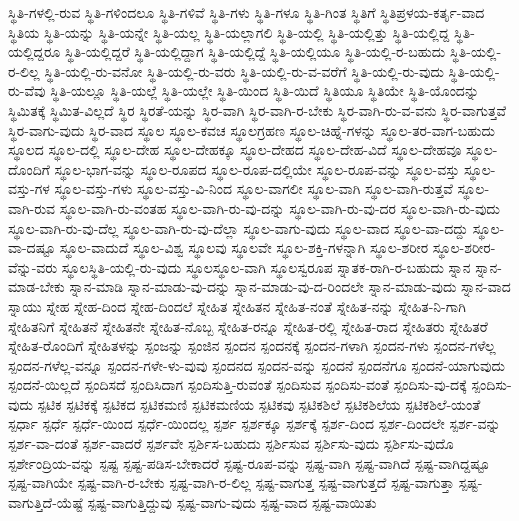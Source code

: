 {ಸ್ಥಿತಿ-ಗಳಲ್ಲಿ-ರುವ
ಸ್ಥಿತಿ-ಗಳಿಂದಲೂ
ಸ್ಥಿತಿ-ಗಳಿವೆ
ಸ್ಥಿತಿ-ಗಳು
ಸ್ಥಿತಿ-ಗಳೂ
ಸ್ಥಿತಿ-ಗಿಂತ
ಸ್ಥಿತಿಗೆ
ಸ್ಥಿತಿಪ್ರಳಯ-ಕರ್ತೃ-ವಾದ
ಸ್ಥಿತಿಯ
ಸ್ಥಿತಿ-ಯನ್ನು
ಸ್ಥಿತಿ-ಯನ್ನೇ
ಸ್ಥಿತಿ-ಯಲ್ಲ
ಸ್ಥಿತಿ-ಯಲ್ಲಾಗಲಿ
ಸ್ಥಿತಿ-ಯಲ್ಲಿ
ಸ್ಥಿತಿ-ಯಲ್ಲಿತ್ತು
ಸ್ಥಿತಿ-ಯಲ್ಲಿದ್ದ
ಸ್ಥಿತಿ-ಯಲ್ಲಿದ್ದರೂ
ಸ್ಥಿತಿ-ಯಲ್ಲಿದ್ದರೆ
ಸ್ಥಿತಿ-ಯಲ್ಲಿದ್ದಾಗ
ಸ್ಥಿತಿ-ಯಲ್ಲಿದ್ದೆ
ಸ್ಥಿತಿ-ಯಲ್ಲಿಯೂ
ಸ್ಥಿತಿ-ಯಲ್ಲಿ-ರ-ಬಹುದು
ಸ್ಥಿತಿ-ಯಲ್ಲಿ-ರ-ಲಿಲ್ಲ
ಸ್ಥಿತಿ-ಯಲ್ಲಿ-ರು-ವನೋ
ಸ್ಥಿತಿ-ಯಲ್ಲಿ-ರು-ವರು
ಸ್ಥಿತಿ-ಯಲ್ಲಿ-ರು-ವ-ವರೆಗೆ
ಸ್ಥಿತಿ-ಯಲ್ಲಿ-ರು-ವುದು
ಸ್ಥಿತಿ-ಯಲ್ಲಿ-ರು-ವೆವು
ಸ್ಥಿತಿ-ಯಲ್ಲೂ
ಸ್ಥಿತಿ-ಯಲ್ಲೆ
ಸ್ಥಿತಿ-ಯಲ್ಲೇ
ಸ್ಥಿತಿ-ಯಿಂದ
ಸ್ಥಿತಿ-ಯಿದೆ
ಸ್ಥಿತಿಯೂ
ಸ್ಥಿತಿಯೇ
ಸ್ಥಿತಿ-ಯೊಂದನ್ನು
ಸ್ಥಿಮಿತಕ್ಕೆ
ಸ್ಥಿಮಿತ-ವಿಲ್ಲದೆ
ಸ್ಥಿರ
ಸ್ಥಿರತೆ-ಯನ್ನು
ಸ್ಥಿರ-ವಾಗಿ
ಸ್ಥಿರ-ವಾಗಿ-ರ-ಬೇಕು
ಸ್ಥಿರ-ವಾಗಿ-ರು-ವ-ವನು
ಸ್ಥಿರ-ವಾಗುತ್ತವೆ
ಸ್ಥಿರ-ವಾಗು-ವುದು
ಸ್ಥಿರ-ವಾದ
ಸ್ಥೂಲ
ಸ್ಥೂಲ-ಕವಚ
ಸ್ಥೂಲಗ್ರಹಣ
ಸ್ಥೂಲ-ಚಿಹ್ನೆ-ಗಳನ್ನು
ಸ್ಥೂಲ-ತರ-ವಾಗ-ಬಹುದು
ಸ್ಥೂಲದ
ಸ್ಥೂಲ-ದಲ್ಲಿ
ಸ್ಥೂಲ-ದೇಹ
ಸ್ಥೂಲ-ದೇಹಕ್ಕೂ
ಸ್ಥೂಲ-ದೇಹದ
ಸ್ಥೂಲ-ದೇಹ-ವಿದೆ
ಸ್ಥೂಲ-ದೇಹವೂ
ಸ್ಥೂಲ-ದೊಂದಿಗೆ
ಸ್ಥೂಲ-ಭಾಗ-ವನ್ನು
ಸ್ಥೂಲ-ರೂಪದ
ಸ್ಥೂಲ-ರೂಪ-ದಲ್ಲಿಯೇ
ಸ್ಥೂಲ-ರೂಪ-ವನ್ನು
ಸ್ಥೂಲ-ವಸ್ತು
ಸ್ಥೂಲ-ವಸ್ತು-ಗಳ
ಸ್ಥೂಲ-ವಸ್ತು-ಗಳು
ಸ್ಥೂಲ-ವಸ್ತು-ವಿ-ನಿಂದ
ಸ್ಥೂಲ-ವಾಗಲೀ
ಸ್ಥೂಲ-ವಾಗಿ
ಸ್ಥೂಲ-ವಾಗಿ-ರುತ್ತವೆ
ಸ್ಥೂಲ-ವಾಗಿ-ರುವ
ಸ್ಥೂಲ-ವಾಗಿ-ರು-ವಂತಹ
ಸ್ಥೂಲ-ವಾಗಿ-ರು-ವು-ದನ್ನು
ಸ್ಥೂಲ-ವಾಗಿ-ರು-ವು-ದರ
ಸ್ಥೂಲ-ವಾಗಿ-ರು-ವುದು
ಸ್ಥೂಲ-ವಾಗಿ-ರು-ವು-ದೆಲ್ಲ
ಸ್ಥೂಲ-ವಾಗಿ-ರು-ವು-ದೆಲ್ಲಾ
ಸ್ಥೂಲ-ವಾಗು-ವುದು
ಸ್ಥೂಲ-ವಾದ
ಸ್ಥೂಲ-ವಾ-ದದ್ದು
ಸ್ಥೂಲ-ವಾ-ದಷ್ಟೂ
ಸ್ಥೂಲ-ವಾದುದೆ
ಸ್ಥೂಲ-ವಿಶ್ವ
ಸ್ಥೂಲವು
ಸ್ಥೂಲವೇ
ಸ್ಥೂಲ-ಶಕ್ತಿ-ಗಳನ್ನಾಗಿ
ಸ್ಥೂಲ-ಶರೀರ
ಸ್ಥೂಲ-ಶರೀರ-ವೆನ್ನು-ವರು
ಸ್ಥೂಲಸ್ಥಿತಿ-ಯಲ್ಲಿ-ರು-ವುದು
ಸ್ಥೂಲಸ್ಥೂಲ-ವಾಗಿ
ಸ್ಥೂಲಸ್ವರೂಪ
ಸ್ನಾತಕ-ರಾಗಿ-ರ-ಬಹುದು
ಸ್ನಾನ
ಸ್ನಾನ-ಮಾಡ-ಬೇಕು
ಸ್ನಾನ-ಮಾಡಿ
ಸ್ನಾನ-ಮಾಡು-ವು-ದನ್ನು
ಸ್ನಾನ-ಮಾಡು-ವು-ದ-ರಿಂದಲೇ
ಸ್ನಾನ-ಮಾಡು-ವುದು
ಸ್ನಾನ-ವಾದ
ಸ್ನಾಯು
ಸ್ನೇಹ
ಸ್ನೇಹ-ದಿಂದ
ಸ್ನೇಹ-ದಿಂದಲೆ
ಸ್ನೇಹಿತ
ಸ್ನೇಹಿತನ
ಸ್ನೇಹಿತ-ನಂತೆ
ಸ್ನೇಹಿತ-ನನ್ನು
ಸ್ನೇಹಿತ-ನಿ-ಗಾಗಿ
ಸ್ನೇಹಿತನಿಗೆ
ಸ್ನೇಹಿತನೆ
ಸ್ನೇಹಿತನೇ
ಸ್ನೇಹಿತ-ನೊಬ್ಬ
ಸ್ನೇಹಿತ-ರನ್ನೂ
ಸ್ನೇಹಿತ-ರಲ್ಲಿ
ಸ್ನೇಹಿತ-ರಾದ
ಸ್ನೇಹಿತರು
ಸ್ನೇಹಿತರೆ
ಸ್ನೇಹಿತ-ರೊಂದಿಗೆ
ಸ್ನೇಹಿತಳನ್ನು
ಸ್ಪಂಜನ್ನು
ಸ್ಪಂಜಿನ
ಸ್ಪಂದನ
ಸ್ಪಂದನಕ್ಕೆ
ಸ್ಪಂದನ-ಗಳಾಗಿ
ಸ್ಪಂದನ-ಗಳು
ಸ್ಪಂದನ-ಗಳೆಲ್ಲ
ಸ್ಪಂದನ-ಗಳೆಲ್ಲ-ವನ್ನೂ
ಸ್ಪಂದನ-ಗಳೇ-ಳು-ವುವು
ಸ್ಪಂದನದ
ಸ್ಪಂದನ-ವನ್ನು
ಸ್ಪಂದನೆ
ಸ್ಪಂದನೆಗೂ
ಸ್ಪಂದನೆ-ಯಾಗುವುದು
ಸ್ಪಂದನೆ-ಯಿಲ್ಲದೆ
ಸ್ಪಂದಿಸದೆ
ಸ್ಪಂದಿಸಿದಾಗ
ಸ್ಪಂದಿಸುತ್ತಿ-ರುವಂತೆ
ಸ್ಪಂದಿಸುವ
ಸ್ಪಂದಿಸು-ವಂತೆ
ಸ್ಪಂದಿಸು-ವು-ದಕ್ಕೆ
ಸ್ಪಂದಿಸು-ವುದು
ಸ್ಪಟಿಕ
ಸ್ಪಟಿಕಕ್ಕೆ
ಸ್ಪಟಿಕದ
ಸ್ಪಟಿಕಮಣಿ
ಸ್ಪಟಿಕಮಣಿಯ
ಸ್ಪಟಿಕವು
ಸ್ಪಟಿಕಶಿಲೆ
ಸ್ಪಟಿಕಶಿಲೆಯ
ಸ್ಪಟಿಕಶಿಲೆ-ಯಂತೆ
ಸ್ಪರ್ಧಾ
ಸ್ಪರ್ಧೆ
ಸ್ಪರ್ಧೆ-ಯಿಂದ
ಸ್ಪರ್ಧೆ-ಯಿಂದಲ್ಲ
ಸ್ಪರ್ಶ
ಸ್ಪರ್ಶಕ್ಕೂ
ಸ್ಪರ್ಶಕ್ಕೆ
ಸ್ಪರ್ಶ-ದಿಂದ
ಸ್ಪರ್ಶ-ದಿಂದಲೇ
ಸ್ಪರ್ಶ-ವನ್ನು
ಸ್ಪರ್ಶ-ವಾ-ದಂತೆ
ಸ್ಪರ್ಶ-ವಾದರೆ
ಸ್ಪರ್ಶವೇ
ಸ್ಪರ್ಶಿಸ-ಬಹುದು
ಸ್ಪರ್ಶಿಸುವ
ಸ್ಪರ್ಶಿಸು-ವುದು
ಸ್ಪರ್ಶಿಸು-ವುದೊ
ಸ್ಪರ್ಶೇಂದ್ರಿಯ-ವನ್ನು
ಸ್ಪಷ್ಟ
ಸ್ಪಷ್ಟ-ಪಡಿಸ-ಬೇಕಾದರೆ
ಸ್ಪಷ್ಟ-ರೂಪ-ವನ್ನು
ಸ್ಪಷ್ಟ-ವಾಗಿ
ಸ್ಪಷ್ಟ-ವಾಗಿದೆ
ಸ್ಪಷ್ಟ-ವಾಗಿದ್ದಷ್ಟೂ
ಸ್ಪಷ್ಟ-ವಾಗಿಯೇ
ಸ್ಪಷ್ಟ-ವಾಗಿ-ರ-ಬೇಕು
ಸ್ಪಷ್ಟ-ವಾಗಿ-ರ-ಲಿಲ್ಲ
ಸ್ಪಷ್ಟ-ವಾಗುತ್ತ
ಸ್ಪಷ್ಟ-ವಾಗುತ್ತದೆ
ಸ್ಪಷ್ಟ-ವಾಗುತ್ತಾ
ಸ್ಪಷ್ಟ-ವಾಗುತ್ತಿದೆ-ಯೆಷ್ಟೆ
ಸ್ಪಷ್ಟ-ವಾಗುತ್ತಿದ್ದುವು
ಸ್ಪಷ್ಟ-ವಾಗು-ವುದು
ಸ್ಪಷ್ಟ-ವಾದ
ಸ್ಪಷ್ಟ-ವಾಯಿತು
}
